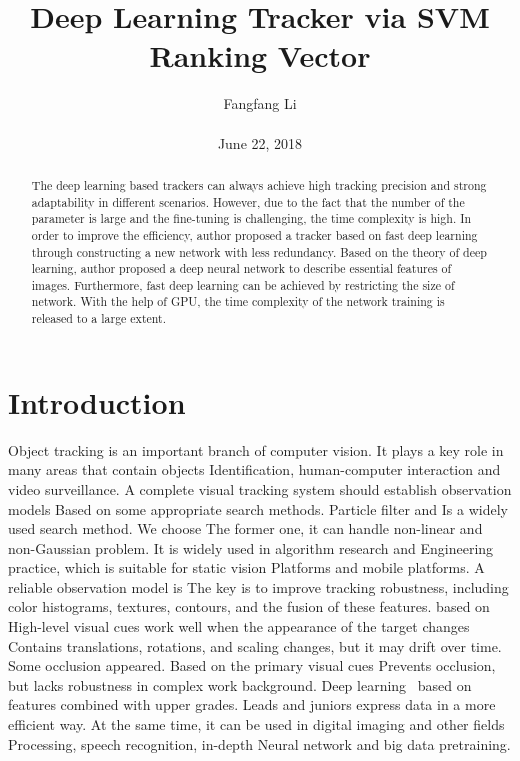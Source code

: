 \documentclass[10pt,twocolumn,letterpaper]{article}
\begin{document}
\title{\textbf{Deep Learning Tracker via SVM Ranking Vector}}
\author{Fangfang Li\\\\June 22, 2018}
\maketitle
\begin{abstract}
The deep learning based trackers can always achieve high tracking
precision and strong adaptability in different scenarios. However, due
to the fact that the number of the parameter is large and the
fine-tuning is challenging, the time complexity is high. In order to
improve the efficiency, author proposed a tracker based on fast deep
learning through constructing a new network with less redundancy.
Based on the theory of deep learning, author proposed a deep neural
network to describe essential features of images. Furthermore, fast
deep learning can be achieved by restricting the size of network. With
the help of GPU, the time complexity of the network training is
released to a large extent.
\end{abstract}
\section{Introduction}
Object tracking is an important branch of computer vision.
It plays a key role in many areas that contain objects
Identification, human-computer interaction and video surveillance.
A complete visual tracking system should establish observation models
Based on some appropriate search methods. Particle filter and
Is a widely used search method. We choose
The former one, it can handle non-linear and non-Gaussian
problem. It is widely used in algorithm research and
Engineering practice, which is suitable for static vision
Platforms and mobile platforms. A reliable observation model is
The key is to improve tracking robustness, including color histograms, textures, contours, and the fusion of these features. based on
High-level visual cues work well when the appearance of the target changes
Contains translations, rotations, and scaling changes, but it may drift over time. Some occlusion appeared. Based on the primary visual cues
Prevents occlusion, but lacks robustness in complex work
background. Deep learning~\cite{Ouyang2014Joint} based on features combined with upper grades. Leads and juniors express data in a more efficient way.
At the same time, it can be used in digital imaging and other fields
Processing, speech recognition, in-depth
Neural network and big data pretraining.
\end{document}
